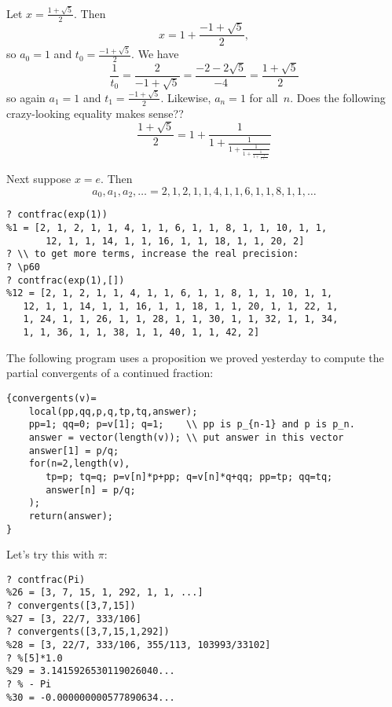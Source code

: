 \documentclass[11pt]{report}
\begin{document}
\begin{example}
  Let $x = \frac{1+\sqrt{5}}{2}.$  Then
  $$
    x = 1 + \frac{-1 + \sqrt{5}}{2},
  $$
  so $a_0 = 1$ and $t_0 = \frac{-1+\sqrt{5}}{2}$.
  We have
  $$
    \frac{1}{t_0} = \frac{2}{-1+\sqrt{5}} = \frac{-2-2\sqrt{5}}{-4}
    = \frac{1+\sqrt{5}}{2}
  $$
  so again $a_1 = 1$ and $t_1 =  \frac{-1+\sqrt{5}}{2}$.
  Likewise, $a_n = 1$ for all~$n$.
  Does the following crazy-looking equality makes sense??
  $$\frac{1+\sqrt{5}}{2} =
    1 + \frac{1}{1 + \frac{1}{1 + \frac{1}{1 + \frac{1}{1 + \frac{1}{1 + \cdots}}}}}
  $$
\end{example}

\begin{example}
  Next suppose $x = e$.  Then
  $$a_0, a_1, a_2, \ldots = 2,1,2,1,1,4,1,1,6,1,1,8,1,1,\ldots$$
  \begin{verbatim}
? contfrac(exp(1))
%1 = [2, 1, 2, 1, 1, 4, 1, 1, 6, 1, 1, 8, 1, 1, 10, 1, 1, 
       12, 1, 1, 14, 1, 1, 16, 1, 1, 18, 1, 1, 20, 2]
? \\ to get more terms, increase the real precision:
? \p60
? contfrac(exp(1),[])
%12 = [2, 1, 2, 1, 1, 4, 1, 1, 6, 1, 1, 8, 1, 1, 10, 1, 1, 
   12, 1, 1, 14, 1, 1, 16, 1, 1, 18, 1, 1, 20, 1, 1, 22, 1, 
   1, 24, 1, 1, 26, 1, 1, 28, 1, 1, 30, 1, 1, 32, 1, 1, 34, 
   1, 1, 36, 1, 1, 38, 1, 1, 40, 1, 1, 42, 2]

\end{verbatim}
  The following program uses a proposition we proved yesterday to compute the partial convergents
  of a continued fraction:
  \begin{verbatim}
{convergents(v)=
    local(pp,qq,p,q,tp,tq,answer);
    pp=1; qq=0; p=v[1]; q=1;    \\ pp is p_{n-1} and p is p_n.
    answer = vector(length(v)); \\ put answer in this vector
    answer[1] = p/q;
    for(n=2,length(v),
       tp=p; tq=q; p=v[n]*p+pp; q=v[n]*q+qq; pp=tp; qq=tq;
       answer[n] = p/q;
    );
    return(answer);
}
\end{verbatim}

  Let's try this with $\pi$:
  \begin{verbatim}
? contfrac(Pi)
%26 = [3, 7, 15, 1, 292, 1, 1, ...]
? convergents([3,7,15])
%27 = [3, 22/7, 333/106]
? convergents([3,7,15,1,292])
%28 = [3, 22/7, 333/106, 355/113, 103993/33102]
? %[5]*1.0
%29 = 3.1415926530119026040...
? % - Pi
%30 = -0.000000000577890634...
\end{verbatim}
\end{example}
\end{document}
